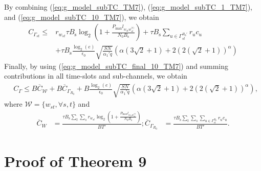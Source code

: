 \documentclass[journal,draftclsnofoot,onecolumn,12pt,twoside]{IEEEtran}
\begin{document}
By combining (\ref{eq:g_model_subTC_TM7}), (\ref{eq:g_model_subTC_1_TM7}), and (\ref{eq:g_model_subTC_10_TM7}), we obtain
\begin{equation}
\begin{aligned}\label{eq:g_model_subTC_final_10_TM7}
C_{\Gamma_{st}}\leq& r_{w_{st}}\tau B_{\text{s}}\log_2\left(1+\frac{P_{\text{max}}l_{w_{st}w_{st}^{\text{(r)}}}}{N_0B_{\text{s}}}\right)+\tau B_{\text{s}}\sum_{u\in\Gamma^{R_0'}_{st}}r_uc_u\\
&+\tau B_{\text{s}}\frac{\log_2(e)}{\epsilon_0}\sqrt{\frac{SN}{\alpha_1' q}}\left(\alpha\left(3\sqrt{2}+1\right)+2(2(\sqrt{2}+1))^{\alpha}\right)
\end{aligned}
\end{equation}
Finally, by using (\ref{eq:g_model_subTC_final_10_TM7}) and summing contributions in all time-slots and sub-channels, we obtain
\begin{equation}
\begin{aligned}\label{eq:g_model_TC_10_TM7}
&C_{\Gamma}\leq B\overline{C}_{\mathcal{W}}+B\overline{C}_{\Gamma_{R_0}}+B\frac{\log_2(e)}{\epsilon_0}\sqrt{\frac{SN}{\alpha_1' q}}\left(\alpha\left(3\sqrt{2}+1\right)+2(2(\sqrt{2}+1))^{\alpha}\right),
\end{aligned}
\end{equation}
where $\mathcal{W}=\lbrace w_{st},\forall s,t\rbrace$ and
\begin{equation}
\begin{aligned}
\overline{C}_{W}&=\frac{\tau B_{\text{s}}\sum_{t}\sum_{s}r_{w_{st}}\log_2\left(1+\frac{P_{\text{max}}l_{w_{st}w_{st}^{\text{(r)}}}}{N_0B_{\text{s}}}\right)}{BT'};
\overline{C}_{\Gamma_{R_0}}&=\frac{\tau B_{\text{s}}\sum_{t}\sum_{s}\sum_{u\in\Gamma^{R_0}_{st}}r_uc_u}{BT'}.
\end{aligned}
\end{equation}

\section{Proof of Theorem 9}

\label{App:ProofThm9}
\end{document}
